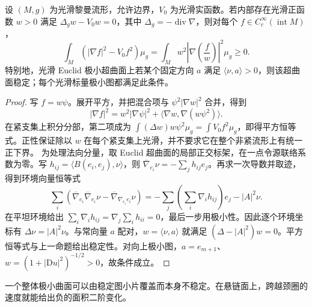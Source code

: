 \begin{proposition}\label{g3:prop:positive-jacobi-stability}
	设 \((M,g)\) 为光滑黎曼流形，允许边界，\(V_0\) 为光滑实函数。若内部存在光滑正函数 \(w>0\) 满足
	\(\Delta_gw-V_0w=0\)，其中 \(\Delta_g=-\operatorname{div}\nabla\)，则对每个 \(f\in C_c^\infty(\operatorname{int}M)\)，
	\begin{equation}\label{g3:eq:positive-jacobi-square-identity}
		\int_M(|\nabla f|^2-V_0f^2)\mu_g
		=\int_M w^2\left|\nabla\left(\frac f w\right)\right|^2\mu_g\ge0.
	\end{equation}
	特别地，光滑 Euclid 极小超曲面上若某个固定方向 \(a\) 满足 \(\langle\nu,a\rangle>0\)，则该超曲面稳定；每个光滑标量极小图都满足此条件。
\end{proposition}
\begin{proof}
	写 \(f=w\psi\)。展开平方，并把混合项与 \(\psi^2|\nabla w|^2\) 合并，得到
	\[
		|\nabla f|^2=w^2|\nabla\psi|^2
		+\langle\nabla w,\nabla(w\psi^2)\rangle.
	\]
	在紧支集上积分分部，第二项成为 \(\int(\Delta w)w\psi^2\mu_g=\int V_0f^2\mu_g\)，即得平方恒等式。正性保证除以 \(w\) 在每个紧支集上光滑，并不要求它在整个非紧流形上有统一正下界。
	为处理法向分量，取 Euclid 超曲面的局部正交标架，在一点令源联络系数为零。写 \(h_{ij}=\langle B(e_i,e_j),\nu\rangle\)，则 \(\overline\nabla_{e_i}\nu=-\sum_jh_{ij}e_j\)。再求一次导数并取迹，得到环境向量恒等式
	\[
		\sum_i\left(\overline\nabla_{e_i}\overline\nabla_{e_i}\nu
		-\overline\nabla_{\nabla_{e_i}e_i}\nu\right)
		=-\sum_j\left(\sum_i\nabla_i h_{ij}\right)e_j-|A|^2\nu.
	\]
	在平坦环境给出
	\(\sum_i\nabla_i h_{ij}=\nabla_j\sum_i h_{ii}=0\)，最后一步用极小性。因此逐个环境坐标有 \(\Delta\nu=|A|^2\nu\)。与常向量 \(a\) 配对，\(w=\langle\nu,a\rangle\) 就满足 \((\Delta-|A|^2)w=0\)。平方恒等式与上一命题给出稳定性。对向上极小图，\(a=e_{m+1}\)、\(w=(1+|\mathrm Du|^2)^{-1/2}>0\)，故条件成立。
\end{proof}

一个整体极小曲面可以由稳定图小片覆盖而本身不稳定。在悬链面上，跨越颈圈的速度就能给出负的面积二阶变化。

